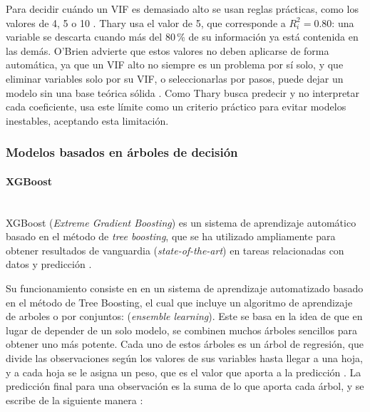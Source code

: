         Para decidir cuándo un VIF es demasiado alto se usan reglas prácticas, como los valores de 4, 5 o 10 \cite{obrien2007vif}. Thary usa el valor de 5, que corresponde a $R_i^2 = 0.80$: una variable se descarta cuando más del 80\,\% de su información ya está contenida en las demás. O'Brien advierte que estos valores no deben aplicarse de forma automática, ya que un VIF alto no siempre es un problema por sí solo, y que eliminar variables solo por su VIF, o seleccionarlas por pasos, puede dejar un modelo sin una base teórica sólida \cite{obrien2007vif}. Como Thary busca predecir y no interpretar cada coeficiente, usa este límite como un criterio práctico para evitar modelos inestables, aceptando esta limitación.

\subsubsection{Modelos basados en árboles de decisión}
    \paragraph{XGBoost}\mbox{}\\

    XGBoost (\textit{Extreme Gradient Boosting}) es un sistema de aprendizaje automático basado en el método de \textit{tree boosting}, que se ha utilizado ampliamente para obtener resultados de vanguardia (\textit{state-of-the-art}) en tareas relacionadas con datos y predicción \cite{chen2016xgboost}. 
    
    Su funcionamiento consiste en en un sistema de aprendizaje automatizado basado en el método de Tree Boosting, el cual que incluye un algoritmo de aprendizaje de arboles o por conjuntos: (\textit{ensemble learning}). Este se basa en la idea de que en lugar de depender de un solo modelo, se combinen muchos árboles sencillos para obtener uno más potente. Cada uno de estos árboles es un árbol de regresión, que divide las observaciones según los valores de sus variables hasta llegar a una hoja, y a cada hoja se le asigna un peso, que es el valor que aporta a la predicción \cite{chen2016xgboost}. La predicción final para una observación es la suma de lo que aporta cada árbol, y se escribe de la siguiente manera \cite{chen2016xgboost}:

